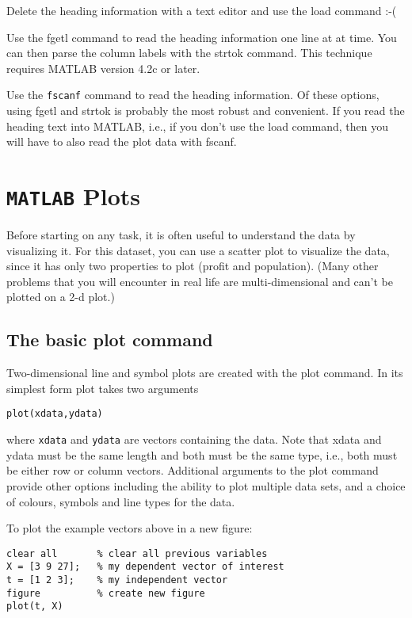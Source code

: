 \documentclass[12pt]{article}
\begin{document}
Delete the heading information with a text editor and use the load command :-(

Use the fgetl command to read the heading information one line at at time. You can then parse the column labels with the strtok command. This technique requires MATLAB version 4.2c or later.

Use the \texttt{fscanf} command to read the heading information.
Of these options, using fgetl and strtok is probably the most robust and convenient. If you read the heading text into MATLAB, i.e., if you don't use the load command, then you will have to also read the plot data with fscanf.

\newpage
\section{\texttt{MATLAB} Plots}
Before starting on any task, it is often useful to understand the data by
visualizing it. For this dataset, you can use a scatter plot to visualize the
data, since it has only two properties to plot (profit and population). (Many
other problems that you will encounter in real life are multi-dimensional and
can't be plotted on a 2-d plot.)
\subsection{The basic plot command}

Two-dimensional line and symbol plots are created with the plot command. In its simplest form plot takes two arguments

\begin{verbatim}
plot(xdata,ydata)
\end{verbatim}
where \texttt{xdata} and \texttt{ydata} are vectors containing the data. Note that xdata and ydata must be the same length and both must be the same type, i.e., both must be either row or column vectors. Additional arguments to the plot command provide other options including the ability to plot multiple data sets, and a choice of colours, symbols and line types for the data.


To plot the example vectors above in a new figure:

\begin{framed}
\begin{verbatim}
clear all 		% clear all previous variables
X = [3 9 27]; 	% my dependent vector of interest
t = [1 2 3]; 	% my independent vector
figure 			% create new figure
plot(t, X)
\end{verbatim}
\end{framed}
\end{document}
